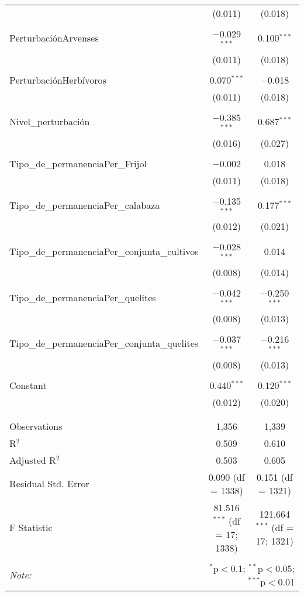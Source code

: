 \documentclass[spanish,11pt]{article}
\begin{document}
\begin{table}[!htbp]
\begin{tabular}{@{\extracolsep{5pt}}lcc}
  & (0.011) & (0.018) \\ 
  & & \\ 
 PerturbaciónArvenses & $-$0.029$^{***}$ & 0.100$^{***}$ \\ 
  & (0.011) & (0.018) \\ 
  & & \\ 
 PerturbaciónHerbívoros & 0.070$^{***}$ & $-$0.018 \\ 
  & (0.011) & (0.018) \\ 
  & & \\ 
 Nivel\_perturbación & $-$0.385$^{***}$ & 0.687$^{***}$ \\ 
  & (0.016) & (0.027) \\ 
  & & \\ 
 Tipo\_de\_permanenciaPer\_Frijol & $-$0.002 & 0.018 \\ 
  & (0.011) & (0.018) \\ 
  & & \\ 
 Tipo\_de\_permanenciaPer\_calabaza & $-$0.135$^{***}$ & 0.177$^{***}$ \\ 
  & (0.012) & (0.021) \\ 
  & & \\ 
 Tipo\_de\_permanenciaPer\_conjunta\_cultivos & $-$0.028$^{***}$ & 0.014 \\ 
  & (0.008) & (0.014) \\ 
  & & \\ 
 Tipo\_de\_permanenciaPer\_quelites & $-$0.042$^{***}$ & $-$0.250$^{***}$ \\ 
  & (0.008) & (0.013) \\ 
  & & \\ 
 Tipo\_de\_permanenciaPer\_conjunta\_quelites & $-$0.037$^{***}$ & $-$0.216$^{***}$ \\ 
  & (0.008) & (0.013) \\ 
  & & \\ 
 Constant & 0.440$^{***}$ & 0.120$^{***}$ \\ 
  & (0.012) & (0.020) \\ 
  & & \\ 
\hline \\[-1.8ex] 
Observations & 1,356 & 1,339 \\ 
R$^{2}$ & 0.509 & 0.610 \\ 
Adjusted R$^{2}$ & 0.503 & 0.605 \\ 
Residual Std. Error & 0.090 (df = 1338) & 0.151 (df = 1321) \\ 
F Statistic & 81.516$^{***}$ (df = 17; 1338) & 121.664$^{***}$ (df = 17; 1321) \\ 
\hline 
\hline \\[-1.8ex] 
\textit{Note:}  & \multicolumn{2}{r}{$^{*}$p$<$0.1; $^{**}$p$<$0.05; $^{***}$p$<$0.01} \\ 
\end{tabular} 
\end{table} 
\end{document}
